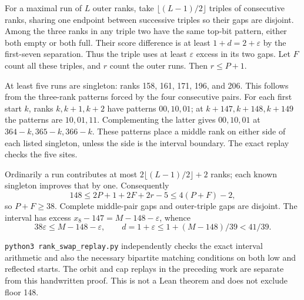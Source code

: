 \documentclass[11pt,letterpaper]{article}
\begin{document}
For a maximal run of \(L\) outer ranks, take \(\lfloor(L-1)/2\rfloor\)
triples of consecutive ranks, sharing one endpoint between successive
triples so their gaps are disjoint. Among the three ranks in any triple
two have the same top-bit pattern, either both empty or both full. Their
score difference is at least \(1+d=2+\varepsilon\) by the first-seven
separation. Thus the triple uses at least \(\varepsilon\) excess in its
two gaps. Let \(F\) count all these triples, and \(r\) count the outer
runs. Then \(r\le P+1\).

At least five runs are singleton: ranks 158, 161, 171, 196, and 206.
This follows from the three-rank patterns forced by the four consecutive
pairs. For each first start \(k\), ranks \(k,k+1,k+2\) have patterns
\(00,10,01\); at \(k+147,k+148,k+149\) the patterns are \(10,01,11\).
Complementing the latter gives \(00,10,01\) at \(364-k,365-k,366-k\).
These patterns place a middle rank on either side of each listed
singleton, unless the side is the interval boundary. The exact replay
checks the five sites.

Ordinarily a run contributes at most \(2\lfloor(L-1)/2\rfloor+2\) ranks;
each known singleton improves that by one. Consequently \[
 148\le 2P+1+2F+2r-5\le4(P+F)-2,
\] so \(P+F\ge38\). Complete middle-pair gaps and outer-triple gaps are
disjoint. The interval has excess \(x_8-147=M-148-\varepsilon\), whence
\[
 38\varepsilon\le M-148-\varepsilon,
 \qquad d=1+\varepsilon\le1+(M-148)/39<41/39.
\]

\texttt{python3\ rank\_swap\_replay.py} independently checks the exact
interval arithmetic and also the necessary bipartite matching conditions
on both low and reflected starts. The orbit and cap replays in the
preceding work are separate from this handwritten proof. This is not a
Lean theorem and does not exclude floor 148.
\end{document}

